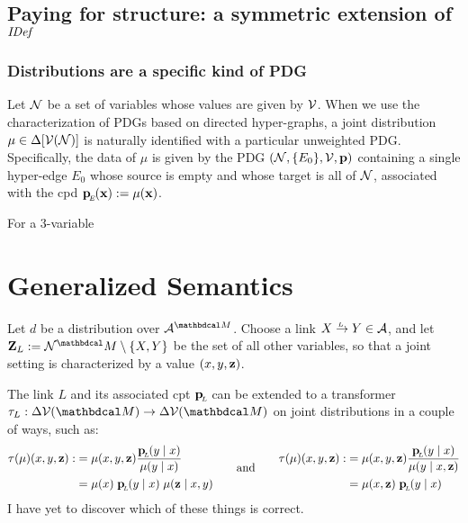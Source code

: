 \documentclass{article}
\begin{document}
    \subsection{Paying for structure: a symmetric extension of $\IDef{}$}

    \subsubsection*{Distributions are a specific kind of PDG}
    Let $\N$ be a set of variables whose values are given by $\V$. When we use the characterization of PDGs based on directed hyper-graphs, a joint distribution $\mu \in \Delta[\V(\N)]$ is naturally identified with a particular unweighted PDG. Specifically, the data of $\mu$ is given by the PDG $(\N, \{ E_0 \}, \V, \mat p)$ containing a single hyper-edge $E_0$ whose source is empty and whose target is all of $\N$, associated with the cpd $\bp[E](\mat x) := \mu(\mat x)$.

    \begin{example}
        For a 3-variable
      \end{example}


	  
	\section{Generalized Semantics}
	Let $d$ be a distribution over $\Ed^{\dg M}$. 
	Choose a link $\ed LXY \in \Ed$, and let $\mathbf Z_L := \N^\dg M \setminus \{X, Y\}$ be the set of all other variables, so that a joint setting is characterized by a value $(x,y,\mat z)$.
	
	The link $L$ and its associated cpt $\bp$ can be extended to a transformer $\tau_L: \Delta \V(\dg M) \to \Delta \V(\dg M)$ on joint distributions in a couple of ways, such as:
\[
	\begin{aligned}
		\tau(\mu)(x,y,\mat z) :&= \mu(x,y,\mat z)\frac{\bp(y \mid x)}{\mu(y\mid x)} \\
		&= \mu(x)\; \bp(y \mid x)\; \mu(\mat z \mid x,y) 
	\end{aligned}\qquad\text{and}\qquad
	\begin{aligned}
		\tau(\mu)(x,y,\mat z) :&= \mu(x,y,\mat z) \frac{\bp(y \mid x)}{\mu(y\mid x, \mathbf z)} \\
		&= \mu(x,\mat z)\; \bp(y \mid x)
	\end{aligned}\\
\]
	I have yet to discover which of these things is correct. 
%	
\end{document}
